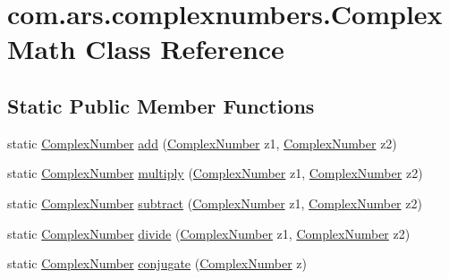 \hypertarget{classcom_1_1ars_1_1complexnumbers_1_1_complex_math}{}\section{com.\+ars.\+complexnumbers.\+Complex\+Math Class Reference}
\label{classcom_1_1ars_1_1complexnumbers_1_1_complex_math}
\subsection*{Static Public Member Functions}
\begin{DoxyCompactItemize}
\item 
static \hyperlink{classcom_1_1ars_1_1complexnumbers_1_1_complex_number}{Complex\+Number} \hyperlink{classcom_1_1ars_1_1complexnumbers_1_1_complex_math_a5d0a70f5fa36204c59c62f3d63391c25}{add} (\hyperlink{classcom_1_1ars_1_1complexnumbers_1_1_complex_number}{Complex\+Number} z1, \hyperlink{classcom_1_1ars_1_1complexnumbers_1_1_complex_number}{Complex\+Number} z2)
\item 
static \hyperlink{classcom_1_1ars_1_1complexnumbers_1_1_complex_number}{Complex\+Number} \hyperlink{classcom_1_1ars_1_1complexnumbers_1_1_complex_math_a0283601c9ce6efc0636468ee5e65f299}{multiply} (\hyperlink{classcom_1_1ars_1_1complexnumbers_1_1_complex_number}{Complex\+Number} z1, \hyperlink{classcom_1_1ars_1_1complexnumbers_1_1_complex_number}{Complex\+Number} z2)
\item 
static \hyperlink{classcom_1_1ars_1_1complexnumbers_1_1_complex_number}{Complex\+Number} \hyperlink{classcom_1_1ars_1_1complexnumbers_1_1_complex_math_a2a8bfbcea23cec290cc91c8eeb9ab4fc}{subtract} (\hyperlink{classcom_1_1ars_1_1complexnumbers_1_1_complex_number}{Complex\+Number} z1, \hyperlink{classcom_1_1ars_1_1complexnumbers_1_1_complex_number}{Complex\+Number} z2)
\item 
static \hyperlink{classcom_1_1ars_1_1complexnumbers_1_1_complex_number}{Complex\+Number} \hyperlink{classcom_1_1ars_1_1complexnumbers_1_1_complex_math_a390a771ed2ef544949621be5375c806a}{divide} (\hyperlink{classcom_1_1ars_1_1complexnumbers_1_1_complex_number}{Complex\+Number} z1, \hyperlink{classcom_1_1ars_1_1complexnumbers_1_1_complex_number}{Complex\+Number} z2)
\item 
static \hyperlink{classcom_1_1ars_1_1complexnumbers_1_1_complex_number}{Complex\+Number} \hyperlink{classcom_1_1ars_1_1complexnumbers_1_1_complex_math_aed293397f1ec0c1dda82589b436388c3}{conjugate} (\hyperlink{classcom_1_1ars_1_1complexnumbers_1_1_complex_number}{Complex\+Number} z)

\end{DoxyCompactItemize}
